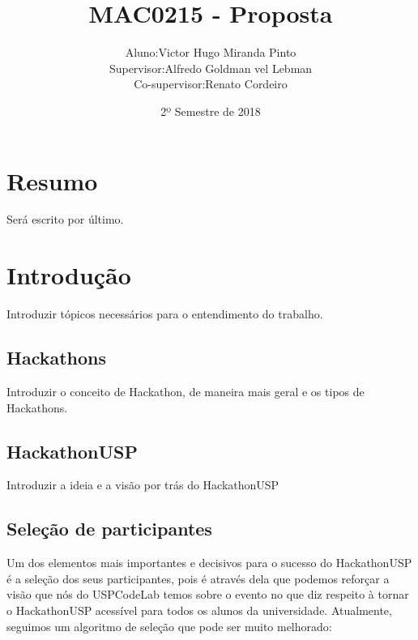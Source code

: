 \documentclass[10pt,twoside,a4paper]{article}
\title{MAC0215 - Proposta}
\author{
  \begin{tabular}{rl}
    Aluno:      & Victor Hugo Miranda Pinto \\
    Supervisor: & Alfredo Goldman vel Lebman \\
    Co-supervisor: & Renato Cordeiro
  \end{tabular}
}
\date{2º Semestre de 2018}
\begin{document}
\maketitle

\section{Resumo}
  Será escrito por último.

\section{Introdução}

  Introduzir tópicos necessários para o entendimento do trabalho.

  \subsection{Hackathons}
  
    Introduzir o conceito de Hackathon, de maneira mais geral e os tipos de Hackathons.

    
  \subsection{HackathonUSP}

    Introduzir a ideia e a visão por trás do HackathonUSP
    
  \subsection{Seleção de participantes}
    
    Um dos elementos mais importantes e decisivos para o sucesso do HackathonUSP é a seleção dos seus participantes, pois é através dela que podemos reforçar a visão que nós do USPCodeLab temos sobre o evento no que diz respeito à tornar o HackathonUSP acessível para todos os alunos da universidade.
    Atualmente, seguimos um algoritmo de seleção que pode ser muito melhorado:
    
\end{document}

